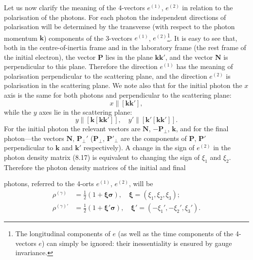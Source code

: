 Let us now clarify the meaning of the 4-vectors $e^{(1)}$, $e^{(2)}$ in relation to the polarisation of the photons. For each photon the independent directions of polarisation will be determined by the transverse (with respect to the photon momentum $\mathbf{k}$) components of the 3-vectors $e^{(1)}$, $e^{(2)}$\footnote{The longitudinal components of $e$ (as well as the time components of the 4-vectors $e$) can simply be ignored: their inessentiality is ensured by gauge invariance.}. It is easy to see that, both in the centre-of-inertia frame and in the laboratory frame (the rest frame of the initial electron), the vector $\mathbf{P}$ lies in the plane $\mathbf{kk}'$, and the vector $\mathbf{N}$ is perpendicular to this plane. Therefore the direction $e^{(1)}$ has the meaning of polarisation perpendicular to the scattering plane, and the direction $e^{(2)}$ is polarisation in the scattering plane. We note also that for the initial photon the $x$ axis is the same for both photons and perpendicular to the scattering plane:
\[
x \parallel [\mathbf{kk}'],
\]
while the $y$ axes lie in the scattering plane:
\[
y \parallel [\mathbf{k}[\mathbf{kk}']],\quad y' \parallel [\mathbf{k}'[\mathbf{kk}']].
\]
For the initial photon the relevant vectors are $\mathbf{N}$, $-\mathbf{P}_\perp$, $\mathbf{k}$, and for the final photon---the vectors $\mathbf{N}$, $\mathbf{P}_\perp'$ ($\mathbf{P}_\perp$, $\mathbf{P}'_\perp$ are the components of $\mathbf{P}$, $\mathbf{P}'$ perpendicular to $\mathbf{k}$ and $\mathbf{k}'$ respectively). A change in the sign of $e^{(2)}$ in the photon density matrix (8.17) is equivalent to changing the sign of $\xi_1$ and $\xi_2$. Therefore the photon density matrices of the initial and final


photons, referred to the 4-orts $e^{(1)}$, $e^{(2)}$, will be
\begin{equation}
\begin{aligned}
\rho^{(\gamma)} &= \tfrac{1}{2}(1 + \boldsymbol{\xi\sigma}), \quad \boldsymbol{\xi} = (\xi_1, \xi_2, \xi_3); \\
\rho^{(\gamma)\prime} &= \tfrac{1}{2}(1 + \boldsymbol{\xi}'\boldsymbol{\sigma}), \quad \boldsymbol{\xi}' = (-\xi_1', -\xi_2', \xi_3').
\end{aligned}
\label{eq:87.9}
\end{equation}

